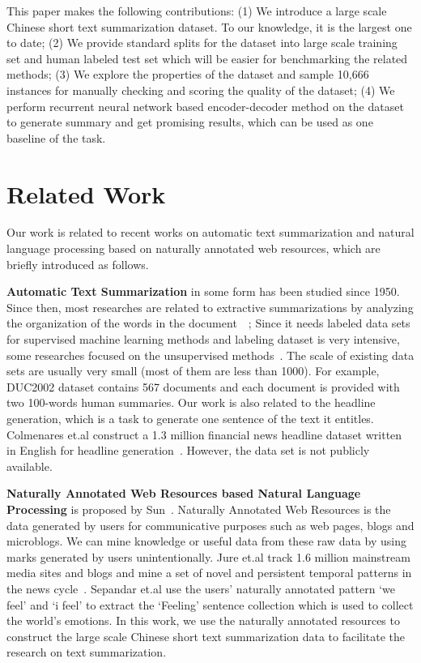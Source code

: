 \documentclass[11pt,a4paper]{article}
\begin{document}
This paper makes the following contributions: (1) We introduce a large scale Chinese short text summarization dataset. To our knowledge, it is the largest one to date; (2) We provide standard splits for the dataset into large scale training set and human labeled test set which will be easier for benchmarking the related methods; (3) We explore the properties of the dataset and sample 10,666 instances for manually checking and scoring the quality of the dataset; (4) We perform recurrent neural network based encoder-decoder method on the dataset to generate summary and get promising results, which can be used as one baseline of the task.

\section{Related Work}
\vspace{-2pt}

Our work is related to recent works on automatic text summarization and natural language processing based on naturally annotated web resources, which are briefly introduced as follows.

\textbf{Automatic Text Summarization} in some form has been studied since 1950. Since then, most researches are related to extractive summarizations by analyzing the organization of the words in the document~\cite{survey_2011}~\cite{ibmluhn}; Since it needs labeled data sets for supervised machine learning methods and labeling dataset is very intensive, some researches focused on the unsupervised methods~\cite{unspervised_1}. The scale of existing data sets are usually very small (most of them are less than 1000). For example, DUC2002 dataset contains 567 documents and each document is provided with two 100-words human summaries. Our work is also related to the headline generation, which is a task to generate one sentence of the text it entitles. Colmenares et.al construct a 1.3 million financial news headline dataset written in English for headline generation~\cite{headline}. However, the data set is not publicly available.

 \textbf{Naturally Annotated Web Resources based Natural Language Processing} is proposed by Sun~\cite{sun}. Naturally Annotated Web Resources is the data generated by users for communicative purposes such as web pages, blogs and microblogs. We can mine knowledge or useful data from these raw data by using marks generated by users unintentionally. Jure et.al track 1.6 million mainstream media sites and blogs and mine a set of novel and persistent temporal patterns in the news cycle~\cite{sun1}. Sepandar et.al use the users' naturally annotated pattern `we feel' and `i feel' to extract the `Feeling' sentence collection which is used to collect the world's emotions. In this work, we use the naturally annotated resources to construct the large scale Chinese short text summarization data to facilitate the research on text summarization.
\end{document}
